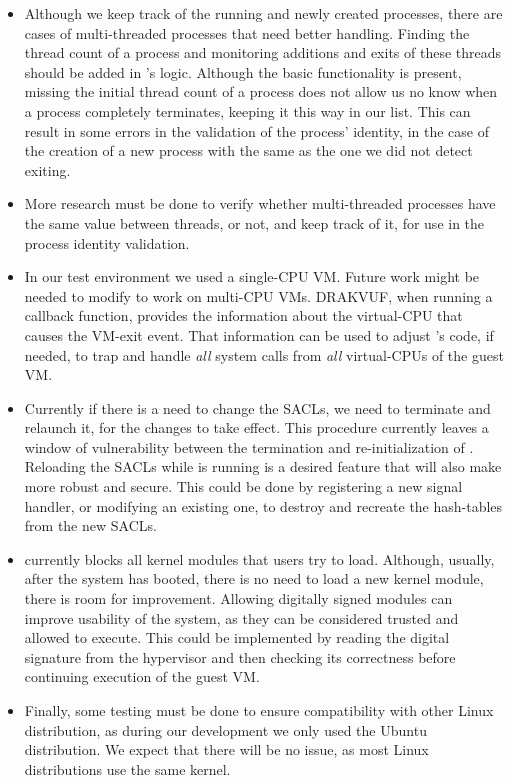 \begin{itemize}

\item Although we keep track of the running and newly created processes, there are cases of multi-threaded processes that need better handling. Finding the thread count of a process and monitoring additions and exits of these threads should be added in 's logic. Although the basic functionality is present, missing the initial thread count of a process does not allow us no know when a process completely terminates, keeping it this way in our list. This can result in some errors in the validation of the process' identity, in the case of the creation of a new process with the same  as the one we did not detect exiting.  

\item More research must be done to verify whether multi-threaded processes have the same  value between threads, or not, and keep track of it, for use in the process identity validation.

\item In our test environment we used a single-\ac{CPU} \ac{VM}. Future work might be needed to modify  to work on multi-\ac{CPU} \acp{VM}. DRAKVUF, when running a callback function, provides the information about the virtual-\ac{CPU} that causes the \ac{VM}-exit event. That information can be used to adjust 's code, if needed, to trap and handle \emph{all} system calls from \emph{all} virtual-\acp{CPU} of the guest \ac{VM}.

\item Currently if there is a need to change the \acp{SACL}, we need to terminate  and relaunch it, for the changes to take effect. This procedure currently leaves a window of vulnerability between the termination and re-initialization of . Reloading the \acp{SACL} while  is running is a desired feature that will also make  more robust and secure. This could be done by registering a new signal handler, or modifying an existing one, to destroy and recreate the hash-tables from the new \acp{SACL}.

\item {} currently blocks all kernel modules that users try to load. Although, usually, after the system has booted, there is no need to load a new kernel module, there is room for improvement. Allowing digitally signed modules can improve usability of the system, as they can be considered trusted and allowed to execute. This could be implemented by reading the digital signature from the hypervisor and then checking its correctness before continuing execution of the guest \ac{VM}.

\item Finally, some testing must be done to ensure compatibility with other Linux distribution, as during our development we only used the Ubuntu distribution. We expect that there will be no issue, as most Linux distributions use the same kernel.

\end{itemize}

